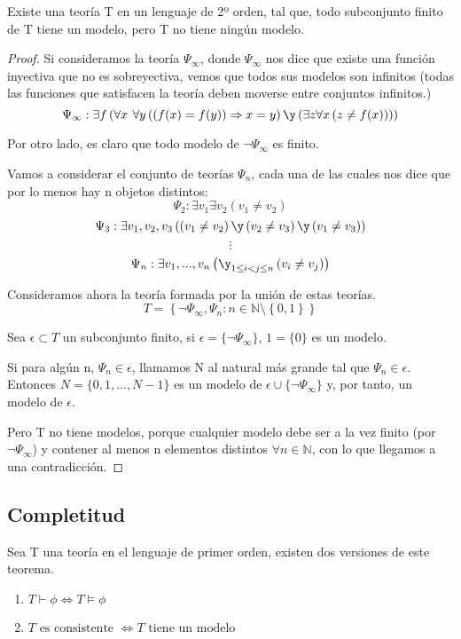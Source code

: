\begin{theorem}
Existe una teoría T en un lenguaje de 2º orden, tal que, todo subconjunto finito de T tiene un modelo, pero T no tiene ningún modelo.
\end{theorem}
\begin{proof}
Si consideramos la teoría $\Psi_{\infty}$, donde $\Psi_{\infty}$ nos dice que existe una función inyectiva que no es sobreyectiva, vemos que todos sus modelos son infinitos (todas las funciones que satisfacen la teoría deben moverse entre conjuntos infinitos.)
$$ \Psi_{\infty}: \exists f \left(\forall x \textbf{ } \forall y \left( \left( f(x)=f(y)\right) \Rightarrow x=y \right) \y \left( \exists z \forall x \left( z \neq f(x) \right) \right) \right) $$


Por otro lado, es claro que todo modelo de $\neg \Psi_{\infty}$ es finito.

Vamos a considerar el conjunto de teorías $\Psi_n$, cada una de las cuales nos dice que por lo menos hay n objetos distintos:
$$ \Psi_2: \exists v_1 \exists v_2 \left(v_1 \neq v_2 \right) $$
$$ \Psi_3: \exists v_1, v_2, v_3 \left( \left(v_1 \neq v_2 \right) \y \left(v_2 \neq v_3 \right) \y \left(v_1 \neq v_3 \right) \right) $$
$$\vdots$$
$$ \Psi_n: \exists v_1,..., v_n \left( \y _{1\leq i < j \leq n} \left(v_i \neq v_j \right)  \right) $$

Consideramos ahora la teoría formada por la unión de estas teorías.
$$T = \left\{ \neg \Psi_{\infty}, \Psi_n : n \in \mathbb{N} \setminus \left\{0,1\right\} \right\}$$

Sea $\epsilon \subset T$ un subconjunto finito, si $\epsilon = \{\neg \Psi_{\infty} \}$, $1=\{0\}$ es un modelo.

Si para algún n, $\Psi_n \in \epsilon$, llamamos N al natural más grande tal que $\Psi_n \in \epsilon$. Entonces $N=\{0,1,...,N-1\}$ es un modelo de $\epsilon \cup \{\neg \Psi_{\infty} \}$ y, por tanto, un modelo de $\epsilon$.

Pero T no tiene modelos, porque cualquier modelo debe ser a la vez finito (por $\neg \Psi_{\infty}$) y contener al menos n elementos distintos $\forall n \in \mathbb{N}$, con lo que llegamos a una contradicción.
\end{proof}


\subsection{Completitud}

\begin{theorem}
Sea T una teoría en el lenguaje de primer orden, existen dos versiones de este teorema.
\begin{enumerate}
\item $T \vdash \phi \Leftrightarrow T \vDash \phi$

\item $T \text{ es consistente } \Leftrightarrow T \text{ tiene un modelo }$
\end{enumerate}
\end{theorem}

